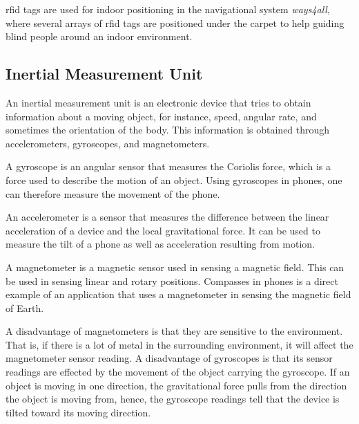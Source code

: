 \gls{rfid} tags are used for indoor positioning in the navigational system \textit{ways4all}, where several arrays of \gls{rfid} tags are positioned under the carpet to help guiding blind people around an indoor environment\cite{HabilitationThesis}.


\subsection{Inertial Measurement Unit} \label{imu-section}

An inertial measurement unit is an electronic device that tries to obtain information about a moving object, for instance, speed, angular rate, and sometimes the orientation of the body. This information is obtained through accelerometers, gyroscopes, and magnetometers.

A gyroscope is an angular sensor that measures the Coriolis force, which is a force used to describe the motion of an object\cite{Gyroscope}. Using gyroscopes in phones, one can therefore measure the movement of the phone.

An accelerometer is a sensor that measures the difference between the linear acceleration of a device and the local gravitational force\cite{Accelerometer}. It can be used to measure the tilt of a phone as well as acceleration resulting from motion\cite{Accelerometer2}.

A magnetometer is a magnetic sensor used in sensing a magnetic field. This can be used in sensing linear and rotary positions. Compasses in phones is a direct example of an application that uses a magnetometer in sensing the magnetic field of Earth.\cite{Magnetometer}

A disadvantage of magnetometers is that they are sensitive to the environment. That is, if there is a lot of metal in the surrounding environment, it will affect the magnetometer sensor reading.\cite{MagnetometerAdvDisadv} %
A disadvantage of gyroscopes is that its sensor readings are effected by the movement of the object carrying the gyroscope. If an object is moving in one direction, the gravitational force pulls from the direction the object is moving from, hence, the gyroscope readings tell that the device is tilted toward its moving direction.\cite{Gyroscope}

